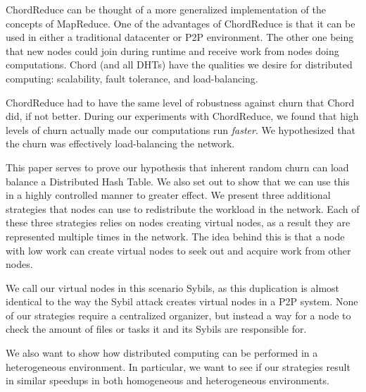 \documentclass[10pt,conference]{IEEEtran}
\begin{document}



ChordReduce can be thought of a more generalized implementation of the concepts of MapReduce.
One of the advantages of ChordReduce is that it can be used in either a traditional datacenter or P2P environment.
The other one being that new nodes could join during runtime and receive work from nodes doing computations.
%
Chord (and all DHTs) have the qualities we desire for distributed computing: scalability, fault tolerance, and load-balancing.

ChordReduce had to have the same level of robustness against churn that Chord did, if not better.
During our experiments with ChordReduce, we found that high levels of churn actually made our computations run \textit{faster}.
We hypothesized that the churn was effectively load-balancing the network.




This paper serves to prove our hypothesis that inherent random churn can load balance a Distributed Hash Table.
We also set out to show that we can use this in a highly controlled manner to greater effect.
We present three additional strategies that nodes can use to redistribute the workload in the network.
Each of these three strategies relies on nodes creating virtual nodes, as a result they are represented multiple times in the network.
The idea behind this is that a node with low work can create virtual nodes to seek out and acquire work from other nodes.

We call our virtual nodes in this scenario Sybils, as this duplication is almost identical to the way the Sybil attack  \cite{sybil} creates virtual nodes in a P2P system.
None of our strategies require a centralized organizer, but instead a way for a node to check the amount of files or tasks it and its Sybils are responsible for.


We also want to show how distributed computing can be performed in a heterogeneous environment.
In particular, we want to see if our strategies result in similar speedups in both homogeneous and heterogeneous environments.

%
%
\end{document}
